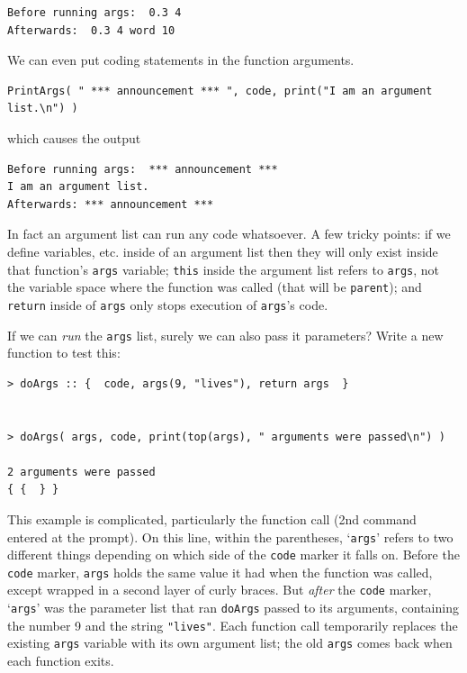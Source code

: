 \documentclass{article}
\newenvironment{code}{
       \begin{list}{}{
               \setlength{\leftmargin}{.4in}
               \setlength{\rightmargin}{0in}
               \setlength{\topsep}{.2in}
       }
       \small
       \item[] }
       { \end{list}   }
\begin{document}
\begin{code} \begin{verbatim}
Before running args:  0.3 4
Afterwards:  0.3 4 word 10
\end{verbatim} \end{code}

\noindent We can even put coding statements in the function arguments.

\begin{code} \begin{verbatim}
PrintArgs( " *** announcement *** ", code, print("I am an argument list.\n") )
\end{verbatim} \end{code}

\noindent which causes the output

\begin{code} \begin{verbatim}
Before running args:  *** announcement *** 
I am an argument list.
Afterwards: *** announcement *** 
\end{verbatim} \end{code}

\noindent In fact an argument list can run any code whatsoever.  A few tricky points:  if we define variables, etc. inside of an argument list then they will only exist inside that function's \verb#args# variable; \verb#this# inside the argument list refers to \verb#args#, not the variable space where the function was called (that will be \verb#parent#); and \verb#return# inside of \verb#args# only stops execution of \verb#args#'s code.

If we can \emph{run} the \texttt{args} list, surely we can also pass it parameters?  Write a new function to test this:

\begin{code} \begin{verbatim}
> doArgs :: {  code, args(9, "lives"), return args  }


> doArgs( args, code, print(top(args), " arguments were passed\n") )

2 arguments were passed
{ {  } }
\end{verbatim} \end{code}

\noindent This example is complicated, particularly the function call (2nd command entered at the prompt).  On this line, within the parentheses, `\texttt{args}' refers to two different things depending on which side of the \verb#code# marker it falls on.  Before the \verb#code# marker, \verb#args# holds the same value it had when the function was called, except wrapped in a second layer of curly braces.  But \emph{after} the \verb#code# marker, `\texttt{args}' was the parameter list that ran \texttt{doArgs} passed to its arguments, containing the number 9 and the string \verb#"lives"#.  Each function call temporarily replaces the existing \verb#args# variable with its own argument list; the old \verb#args# comes back when each function exits.
\end{document}
